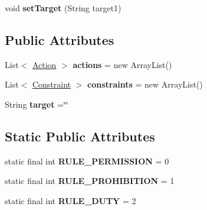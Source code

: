\begin{DoxyCompactItemize}
\item 
\hypertarget{classodrlmodel_1_1_rule_a4a1f1badbc19cab2f3fb03af9868539b}{void {\bfseries set\-Target} (String target1)}\label{classodrlmodel_1_1_rule_a4a1f1badbc19cab2f3fb03af9868539b}

\end{DoxyCompactItemize}
\subsection*{Public Attributes}
\begin{DoxyCompactItemize}
\item 
\hypertarget{classodrlmodel_1_1_rule_a85913597237b11690fef60de3e33137e}{List$<$ \hyperlink{classodrlmodel_1_1_action}{Action} $>$ {\bfseries actions} = new Array\-List()}\label{classodrlmodel_1_1_rule_a85913597237b11690fef60de3e33137e}

\item 
\hypertarget{classodrlmodel_1_1_rule_a1ca369a8e3a30722213bd38d3e943e71}{List$<$ \hyperlink{classodrlmodel_1_1_constraint}{Constraint} $>$ {\bfseries constraints} = new Array\-List()}\label{classodrlmodel_1_1_rule_a1ca369a8e3a30722213bd38d3e943e71}

\item 
\hypertarget{classodrlmodel_1_1_rule_a016cea87c7c33f40b2f7af162fb96d71}{String {\bfseries target} =\char`\"{}\char`\"{}}\label{classodrlmodel_1_1_rule_a016cea87c7c33f40b2f7af162fb96d71}

\end{DoxyCompactItemize}
\subsection*{Static Public Attributes}
\begin{DoxyCompactItemize}
\item 
\hypertarget{classodrlmodel_1_1_rule_a60761e0d1bbaf52812face396feb6985}{static final int {\bfseries R\-U\-L\-E\-\_\-\-P\-E\-R\-M\-I\-S\-S\-I\-O\-N} = 0}\label{classodrlmodel_1_1_rule_a60761e0d1bbaf52812face396feb6985}

\item 
\hypertarget{classodrlmodel_1_1_rule_abd05faac196bb56c1edf254268a2df8e}{static final int {\bfseries R\-U\-L\-E\-\_\-\-P\-R\-O\-H\-I\-B\-I\-T\-I\-O\-N} = 1}\label{classodrlmodel_1_1_rule_abd05faac196bb56c1edf254268a2df8e}

\item 
\hypertarget{classodrlmodel_1_1_rule_acc7b2c95eee78645cd4614c8202c96ec}{static final int {\bfseries R\-U\-L\-E\-\_\-\-D\-U\-T\-Y} = 2}\label{classodrlmodel_1_1_rule_acc7b2c95eee78645cd4614c8202c96ec}

\end{DoxyCompactItemize}
